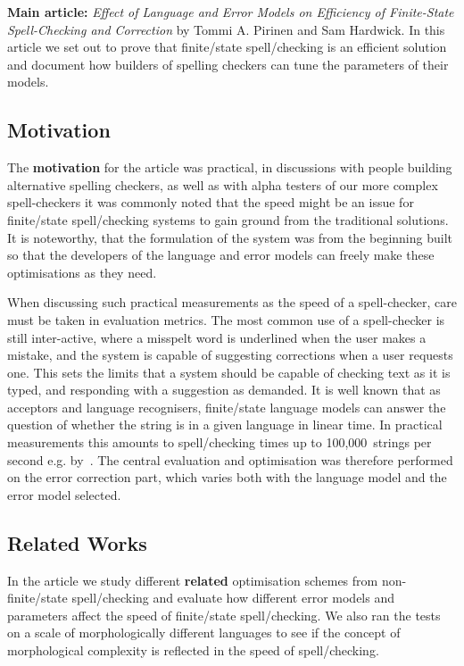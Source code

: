 \documentclass[officiallayout,final]{unihelcompling}
\begin{document}
\textbf{Main article:} \emph{Effect of Language and Error Models on Efficiency
of Finite-State Spell-Checking and Correction} by Tommi A. Pirinen and Sam
Hardwick. In this article we set out to prove that finite\-/state
spell\-/checking is an efficient solution and document how builders of
spelling checkers can tune the parameters of their models.

\subsection{Motivation}

The \textbf{motivation} for the article was practical, in discussions with
people building alternative spelling checkers, as well as with alpha testers of
our more complex spell-checkers it was commonly noted that the speed might be
an issue for finite\-/state spell\-/checking systems to gain ground from the
traditional solutions. It is noteworthy, that the formulation of the system was
from the beginning built so that the developers of the language and error
models can freely make these optimisations as they need.

When discussing such practical measurements as the speed of a spell-checker,
care must be taken in evaluation metrics. The most common use of a
spell-checker is still inter-active, where a misspelt word is underlined when
the user makes a mistake, and the system is capable of suggesting corrections
when a user requests one. This sets the limits that a system should be capable
of checking text as it is typed, and responding with a suggestion as demanded.
It is well known that as acceptors and language recognisers, finite\-/state
language models can answer the question of whether the string is in a given
language in linear time. In practical measurements this amounts to
spell\-/checking times up to 100,000~strings per second e.g.
by~\citet{silfverberg2009hfst}. The central evaluation and optimisation was
therefore performed on the error correction part, which varies both with the
language model and the error model selected.

\subsection{Related Works}

In the article we study different \textbf{related} optimisation schemes from
non-finite\-/state spell\-/checking and evaluate how different error models and
parameters affect the speed of finite\-/state spell\-/checking. We also ran the
tests on a scale of morphologically different languages to see if the concept
of morphological complexity is reflected in the speed of spell\-/checking.
\end{document}
